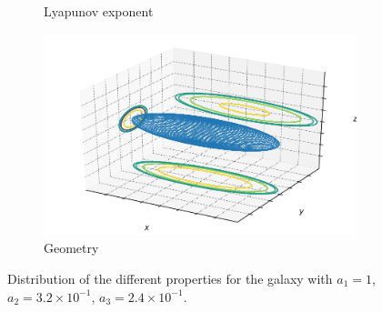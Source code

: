 \begin{figure}[h]
\begin{subfigure}[t]{0.4\textwidth}
        \caption{Lyapunov exponent}
    \end{subfigure}
    \begin{subfigure}[t]{0.4\textwidth}
        \includegraphics[width=\textwidth]{"../Files/Week 13/images/8_ellipsoid"}
        \caption{Geometry}
    \end{subfigure}
    \caption{Distribution of the different properties for the galaxy with $a_1 = 1$, $a_2 = 3.2\times10^{-1}$, $a_3 = 2.4\times10^{-1}$.}
\end{figure}


